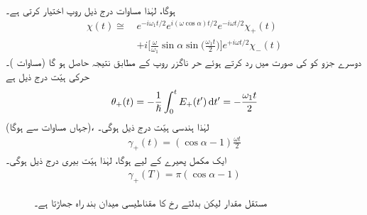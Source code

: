 ہوگا، لہٰذا مساوات  درج ذیل روپ اختیار کرتی ہے۔ 
\begin{align}
\chi (t) \cong \,&e^{- i \omega_1 t/2} e^{i (\omega \cos \alpha) t/2} e^{- i \omega t/2} \chi_+(t) \nonumber\\
&+i \big [ \frac{\omega}{\omega_1} \sin \alpha \sin \big ( \frac{\omega_1 t}{2} \big ) \big ]e^{+ i \omega t/2} \chi_{-} (t)
\end{align}
دوسرے جزو کو  کی صورت میں رد کرتے ہوئے حر ناگزر روپ کے مطابق نتیجہ حاصل ہو گا (مساوات )۔ حرکی ہیّت درج ذیل ہے 
\begin{align}
\theta_+ (t) = - \frac{1}{\hslash} \int_0^t E_+ (t') \dif t' = - \frac{\omega_1 t}{2}
\end{align}
(جہاں مساوات  سے  ہوگا)، لہٰذا ہندسی ہیّت درج ذیل ہوگی۔
\begin{align}
\gamma_+ (t) = (\cos \alpha - 1) \frac{\omega t}{2}
\end{align}
ایک مکمل پھیرے کے لیے  ہوگا، لہٰذا ہیّت بیری درج ذیل ہوگی۔
\begin{align}\label{مساوات_حر_گاما}
\gamma_+ (T) = \pi (\cos \alpha - 1)
\end{align}

\begin{figure}
\centering
{}
\caption{مستقل مقدار لیکن بدلتے رخ کا مقناطیسی میدان بند راہ جھاڑتا ہے۔}
\label{شکل_حرارت_نا_گزر_مقناطیسی_میدان_بند_راہ}
\end{figure}

